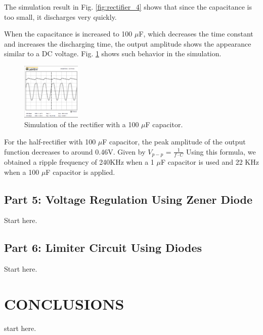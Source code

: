\documentclass[letterpaper, 10 pt, conference]{ieeeconf}  %
\begin{document}
    \par The simulation result in Fig. \ref{fig:rectifier_4} shows that since the
    capacitance is too small, it discharges very quickly.
    \par When the capacitance is increased to 100 $\mu$F, which decreases the time
    constant and increases the discharging time, the output amplitude shows the appearance
    similar to a DC voltage. Fig. \ref{fig:rectifier_5} shows such behavior in the simulation.
    \begin{figure}[h]
      \centering
        \includegraphics[width=0.25\textwidth]{images/halfwave_100miuf.png}
      \caption{Simulation of the rectifier with a 100 $\mu$F capacitor.}
      \label{fig:rectifier_5}
    \end{figure}
    \par For the half-rectifier with 100 $\mu$F capacitor, the peak amplitude of
    the output function decreases to around 0.46V. Given by $V_{p-p}$ = $\frac {1}{f \cdot C}$
    Using this formula, we obtained a ripple frequency of 240KHz when a 1 $\mu$F
    capacitor is used and 22 KHz when a 100 $\mu$F capacitor is applied.
    \subsection{Part 5: Voltage Regulation Using Zener Diode}
    Start here.
    \subsection{Part 6: Limiter Circuit Using Diodes}
    Start here.

    \section{CONCLUSIONS}
    start here.

\end{document}
